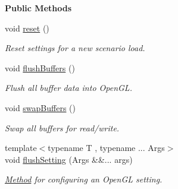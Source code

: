 \begin{Indent}\textbf{ Public Methods}\par
\begin{DoxyCompactItemize}
\item 
\mbox{\label{classrev_1_1_render_context_a174d0b52c13b5a85474d054120bc8915}} 
void \mbox{\hyperlink{classrev_1_1_render_context_a174d0b52c13b5a85474d054120bc8915}{reset}} ()
\begin{DoxyCompactList}\small\item\em Reset settings for a new scenario load. \end{DoxyCompactList}\item 
\mbox{\label{classrev_1_1_render_context_a2e9ecc8a856e686427dee70bb5ae3e40}} 
void \mbox{\hyperlink{classrev_1_1_render_context_a2e9ecc8a856e686427dee70bb5ae3e40}{flush\+Buffers}} ()
\begin{DoxyCompactList}\small\item\em Flush all buffer data into Open\+GL. \end{DoxyCompactList}\item 
\mbox{\label{classrev_1_1_render_context_a19ed5da725ad2ffdbbfc1cad8d289b24}} 
void \mbox{\hyperlink{classrev_1_1_render_context_a19ed5da725ad2ffdbbfc1cad8d289b24}{swap\+Buffers}} ()
\begin{DoxyCompactList}\small\item\em Swap all buffers for read/write. \end{DoxyCompactList}\item 
\mbox{\label{classrev_1_1_render_context_acf8bc4525ddb9b23634eef647d5197bf}} 
{\footnotesize template$<$typename T , typename ... Args$>$ }\\void \mbox{\hyperlink{classrev_1_1_render_context_acf8bc4525ddb9b23634eef647d5197bf}{flush\+Setting}} (Args \&\&... args)
\begin{DoxyCompactList}\small\item\em \mbox{\hyperlink{struct_method}{Method}} for configuring an Open\+GL setting. \end{DoxyCompactList}\item 
\mbox{\label{classrev_1_1_render_context_a949819b497a7c0527c69c0873ab0b455}} 

\end{DoxyCompactItemize}
\end{Indent}
